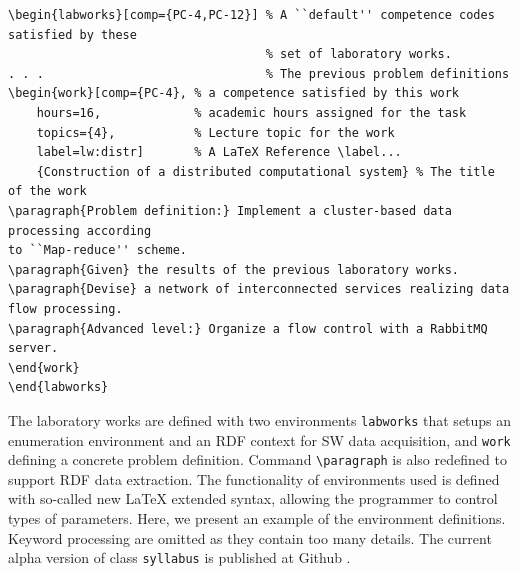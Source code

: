 \documentclass[
]{ceurart}
\begin{document}
\begin{verbatim}
\begin{labworks}[comp={PC-4,PC-12}] % A ``default'' competence codes satisfied by these
                                    % set of laboratory works.
. . .                               % The previous problem definitions
\begin{work}[comp={PC-4}, % a competence satisfied by this work
    hours=16,             % academic hours assigned for the task
    topics={4},           % Lecture topic for the work
    label=lw:distr]       % A LaTeX Reference \label...
    {Construction of a distributed computational system} % The title of the work
\paragraph{Problem definition:} Implement a cluster-based data processing according
to ``Map-reduce'' scheme.
\paragraph{Given} the results of the previous laboratory works.
\paragraph{Devise} a network of interconnected services realizing data flow processing.
\paragraph{Advanced level:} Organize a flow control with a RabbitMQ server.
\end{work}
\end{labworks}
\end{verbatim}

The laboratory works are defined with two environments \verb|labworks| that setups an enumeration environment and an RDF context for SW data acquisition, and \verb|work| defining a concrete problem definition.  Command \verb|\paragraph| is also redefined to support RDF data extraction.  The functionality of environments used is defined with so-called new \LaTeX{} extended syntax, allowing the programmer to control types of parameters.  Here, we present an example of the environment definitions. Keyword processing are omitted as they contain too many details.  The current alpha version of class \verb|syllabus| is published at Github \cite{ghs}. %
\end{document}
